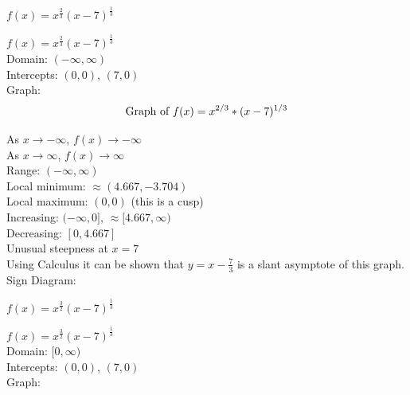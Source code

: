 \documentclass{ximera}
\begin{document}
\begin{question}
\begin{enumerate}
\end{enumerate}

\begin{problem}\label{powerfcngraphexfirst} $f(x) = x^{\frac{2}{3}}(x - 7)^{\frac{1}{3}}$

\begin{solution}
$f(x) = x^{\frac{2}{3}}(x - 7)^{\frac{1}{3}}$\\
Domain: $(-\infty, \infty)$\\
Intercepts: $(0,0)$, $(7,0)$\\
Graph: \\

$$\text{Graph of $f(x)=x^{2/3}*(x-7)^{1/3}$}$$

As $x \rightarrow -\infty$, $f(x) \rightarrow -\infty$\\
As $x \rightarrow \infty$, $f(x) \rightarrow \infty$\\
Range: $(-\infty, \infty)$\\
Local minimum: $\approx (4.667, -3.704)$\\
Local maximum: $(0,0)$ (this is a cusp) \\
Increasing: $(-\infty, 0]$, $\approx [4.667, \infty)$\\
Decreasing: $[0, 4.667]$\\
Unusual steepness at $x = 7$\\
Using Calculus it can be shown that $y = x - \frac{7}{3}$ is a slant asymptote of this graph.\\
Sign Diagram:\\
\begin{image}
\end{image}
\end{solution}
\end{problem}

\begin{problem} $f(x) = x^{\frac{3}{2}}(x - 7)^{\frac{1}{3}}$  

\begin{solution}
$f(x) = x^{\frac{3}{2}}(x - 7)^{\frac{1}{3}}$\\
Domain: $[0, \infty)$\\
Intercepts: $(0,0)$, $(7,0)$\\
Graph: \\


\end{solution}
\end{problem}
\end{question}
\end{document}

